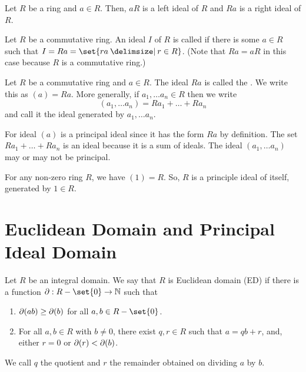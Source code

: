 \documentclass[11pt]{penrose}
\begin{document}
\begin{nlemma}
    Let $R$ be a ring and $a \in R$. Then, $aR$ is a left ideal of $R$ and $Ra$ is a right ideal of $R$.
\end{nlemma}

\begin{ndfn}
    Let $R$ be a commutative ring. An ideal $I$ of $R$ is called  if there is some $a \in R$ such that $I = Ra = \set{ra \st r \in R}$. (Note that $Ra = aR$ in this case because $R$ is a commutative ring.)
\end{ndfn}

\begin{ndfn}
    Let $R$ be a commutative ring and $a \in R$. The ideal $Ra$ is called the . We write this as $(a) = Ra$. More generally, if $a_1, \dots a_n \in R$ then we write
    \begin{equation*}
        (a_1, \dots a_n) = Ra_1 + \dots + Ra_n
    \end{equation*}
    and call it the ideal generated by $a_1, \dots a_n$.
\end{ndfn}

\begin{remark}
    For ideal $(a)$ is a principal ideal since it has the form $Ra$ by definition. The set $Ra_1 + \dots + Ra_n$ is an ideal because it is a sum of ideals. The ideal $(a_1, \dots a_n)$ may or may not be principal.
\end{remark}

\begin{negg}
    For any non-zero ring $R$, we have $(1) = R$. So, $R$ is a principle ideal of itself, generated by $1 \in R$.
\end{negg}

\section{Euclidean Domain and Principal Ideal Domain}
\begin{ndfn}
    Let $R$ be an integral domain. We say that $R$ is Euclidean domain (ED) if there is a function $\pd : R - \set{0} \to \N$ such that
    \begin{enumerate}
        \item $\partial(ab) \geq \partial(b)$ for all $a, b \in R - \set{0}$.
        \item For all $a, b \in R$ with $b \neq 0$, there exist $q, r \in R$ such that $a = qb + r$, and, either $r = 0$ or $\partial(r) < \partial(b)$.
    \end{enumerate}
    We call $q$ the quotient and $r$ the remainder obtained on dividing $a$ by $b$.
\end{ndfn}
\end{document}
